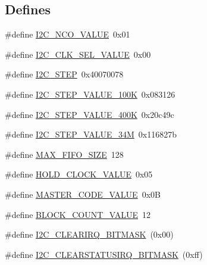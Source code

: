 \subsection*{Defines}
\begin{DoxyCompactItemize}
\item 
\#define \hyperlink{a00516_a018ca5b94b592748dc0c5067ba5b53b9}{I2C\_\-NCO\_\-VALUE}~0x01
\item 
\#define \hyperlink{a00516_a6cad032e96be8fa3ad31d085c758a573}{I2C\_\-CLK\_\-SEL\_\-VALUE}~0x00
\item 
\#define \hyperlink{a00516_a254ad9d333377934566571cb085a6735}{I2C\_\-STEP}~0x40070078
\item 
\#define \hyperlink{a00516_ad0d2c364d420c2463f7bc57ee1816acc}{I2C\_\-STEP\_\-VALUE\_\-100K}~0x083126
\item 
\#define \hyperlink{a00516_a3d3b7d87fcf2351f9db5d426e344a934}{I2C\_\-STEP\_\-VALUE\_\-400K}~0x20c49c
\item 
\#define \hyperlink{a00516_affce4a0cfddd2ddf661fe33b4b60cb67}{I2C\_\-STEP\_\-VALUE\_\-34M}~0x116827b
\item 
\#define \hyperlink{a00516_a70781c406c17458a408f41de8605edfd}{MAX\_\-FIFO\_\-SIZE}~128
\item 
\#define \hyperlink{a00516_a8d74e4c372da075d89cf1f067a056368}{HOLD\_\-CLOCK\_\-VALUE}~0x05
\item 
\#define \hyperlink{a00516_affcc1dcbe50bbf9e262eb3fdd0ece3f4}{MASTER\_\-CODE\_\-VALUE}~0x0B
\item 
\#define \hyperlink{a00516_aadd6c6fc61177e3aa132d309515f93fb}{BLOCK\_\-COUNT\_\-VALUE}~12
\item 
\#define \hyperlink{a00516_aed890941c63a6b5ffef9e6d6858287f8}{I2C\_\-CLEARIRQ\_\-BITMASK}~(0x00)
\item 
\#define \hyperlink{a00516_a58947b4668e625ae55a8e9f3648ad78d}{I2C\_\-CLEARSTATUSIRQ\_\-BITMASK}~(0xff)
\end{DoxyCompactItemize}
